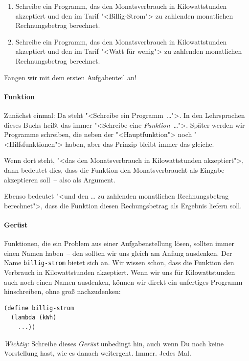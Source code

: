   \begin{enumerate}
  \item Schreibe ein Programm, das den Monatsverbrauch in
    Kilowattstunden akzeptiert und den im Tarif "<Billig-Strom"> zu
    zahlenden monatlichen Rechnungsbetrag berechnet.

  \item Schreibe ein Programm, das den Monatsverbrauch in
    Kilowattstunden akzeptiert und den im Tarif "<Watt für wenig"> zu
    zahlenden monatlichen Rechnungsbetrag
    berechnet.
  \end{enumerate}
Fangen wir mit dem ersten Aufgabenteil an!

\paragraph{Funktion}

Zunächst einmal: Da steht "<Schreibe ein Programm~\ldots">.  In den
Lehrsprachen dieses Buchs heißt das immer "<Schreibe eine
\emph{Funktion}~\ldots">.  Später werden wir Programme schreiben, die
neben der "<Hauptfunktion"> noch "<Hilfsfunktionen"> haben, aber das
Prinzip bleibt immer das gleiche.

Wenn dort steht, "<das den Monatsverbrauch in Kilowattstunden
akzeptiert">, dann bedeutet dies, dass die Funktion den
Monatsverbraucht als Eingabe akzeptieren soll~-- also als Argument.

Ebenso bedeutet "<und den \ldots{} zu zahlenden monatlichen
Rechnungsbetrag berechnet">, dass die Funktion diesen Rechungsbetrag
als Ergebnis liefern soll.

\paragraph{Gerüst}

Funktionen, die ein Problem aus einer Aufgabenstellung lösen, sollten immer
einen Namen haben~-- den sollten wir uns gleich am Anfang ausdenken. Der Name
\lstinline{billig-strom} bietet sich an. Wir wissen schon, dass die Funktion
den Verbrauch in Kilowattstunden akzeptiert. Wenn wir uns für Kilowattstunden
auch noch einen Namen ausdenken, können wir direkt ein unfertiges Programm
hinschreiben, ohne groß nachzudenken:
%
\begin{lstlisting}
(define billig-strom
  (lambda (kWh)
    ...))
\end{lstlisting}
%
\emph{Wichtig:} Schreibe dieses \textit{Gerüst}
unbedingt hin, auch wenn Du noch keine Vorstellung hast, wie es danach
weitergeht.  Immer.  Jedes Mal.

